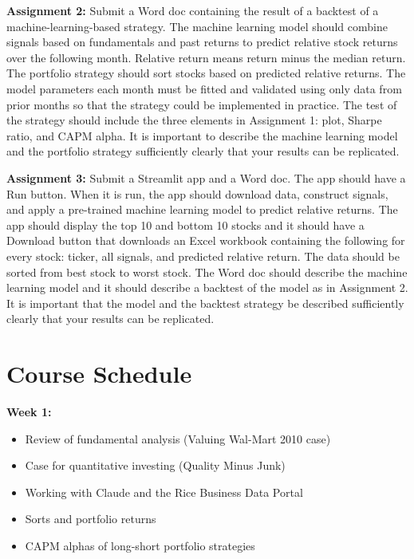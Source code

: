 \documentclass[11pt]{article}
\begin{document}
\vspace{1em}

\textbf{Assignment 2:} Submit a Word doc containing the result of a backtest of a machine-learning-based strategy. The machine learning model should combine signals based on fundamentals and past returns to predict relative stock returns over the following month. Relative return means return minus the median return. The portfolio strategy should sort stocks based on predicted relative returns. The model parameters each month must be fitted and validated using only data from prior months so that the strategy could be implemented in practice. The test of the strategy should include the three elements in Assignment 1: plot, Sharpe ratio, and CAPM alpha. It is important to describe the machine learning model and the portfolio strategy sufficiently clearly that your results can be replicated.

\vspace{1em}

\textbf{Assignment 3:} Submit a Streamlit app and a Word doc. The app should have a Run button. When it is run, the app should download data, construct signals, and apply a pre-trained machine learning model to predict relative returns. The app should display the top 10 and bottom 10 stocks and it should have a Download button that downloads an Excel workbook containing the following for every stock: ticker, all signals, and predicted relative return. The data should be sorted from best stock to worst stock. The Word doc should describe the machine learning model and it should describe a backtest of the model as in Assignment 2. It is important that the model and the backtest strategy be described sufficiently clearly that your results can be replicated.

\section{Course Schedule}

\vspace{1em}
\noindent\textbf{Week 1:}
\begin{itemize}[topsep=0pt, itemsep=0pt]
\item Review of fundamental analysis (Valuing Wal-Mart 2010 case)
\item Case for quantitative investing (Quality Minus Junk)
\item Working with Claude and the Rice Business Data Portal
\item Sorts and portfolio returns
\item CAPM alphas of long-short portfolio strategies
\end{itemize}
\end{document}
